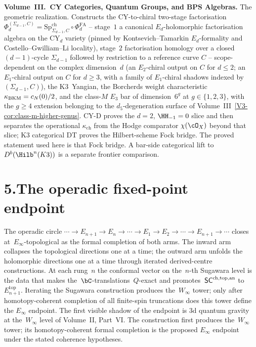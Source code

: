 \noindent\textbf{Volume~III.\ CY Categories, Quantum Groups, and BPS
Algebras.}\enspace
The geometric realization. Constructs the CY-to-chiral two-stage
factorisation
$\Phi_d^{(\Sigma_{d-1},C)} = \mathrm{Sp}^{\mathrm{ch}}_{\Sigma_{d-1}, C} \circ
\Phi^{\mathrm{FA}}_d$ -- stage~$1$ a canonical $E_d$-holomorphic
factorisation algebra on the CY$_d$ variety (pinned by
Kontsevich--Tamarkin $E_d$-formality and Costello--Gwilliam--Li
locality), stage~$2$ factorisation homology over a closed
$(d-1)$-cycle $\Sigma_{d-1}$ followed by restriction to a reference
curve $C$ -- scope-dependent on the complex dimension~$d$ (an
$E_2$-chiral output on $C$ for $d\le 2$; an $E_1$-chiral output on
$C$ for $d\ge 3$, with a family of $E_1$-chiral shadows indexed by
$(\Sigma_{d-1}, C)$), the K3~Yangian,
the Borcherds weight characteristic~$\kappa_{\mathrm{BKM}} = c_N(0)/2$, and the
class-$M$ $E_3$ bar of
dimension~$6^g$ at $g\in\{1,2,3\}$, with the $g\ge 4$ extension
belonging to the $d_5$-degeneration surface of
Volume~III~\ref{V3-cor:class-m-higher-genus}.
CY-D proves the $d=2$,
$\HH_{-1}=0$ slice and then separates the operational
$\kappa_{\mathrm{ch}}$ from the Hodge comparator
$\chi(\cO_X)$ beyond that slice; K3 categorical DT proves the
Hilbert-scheme Fock bridge. The proved statement used here is that
Fock bridge.  A bar-side categorical lift to
$D^b(\Hilb^n(K3))$ is a separate frontier comparison.

\section*{5.\quad The operadic fixed-point endpoint}

\noindent
The operadic circle
$\cdots\to E_{n+1}\to E_n\to\cdots\to E_1\to E_2\to\cdots\to E_{n+1}\to\cdots$
closes at~$E_\infty$-topological as the formal completion of both
arms. The inward arm collapses the topological directions one at a
time; the outward arm unfolds the holomorphic directions one at a
time through iterated derived-centre constructions. At each rung~$n$
the conformal vector on the~$n$-th Sugawara level is the data that
makes the~$\bC$-translations~$Q$-exact and promotes~$\mathsf{SC}^{\mathrm{ch,top,an}}$
to~$E_{n+1}^{\mathrm{top}}$. Iterating the Sugawara construction
produces the~$W_\infty$ tower; only after homotopy-coherent
completion of all finite-spin truncations does this tower define the
$E_\infty$ endpoint.
The first visible shadow of the endpoint is 3d quantum gravity at
the~$W_\infty$ level of Volume~II, Part~VI\@. The construction first
produces the~$W_\infty$ tower; its homotopy-coherent formal completion
is the proposed $E_\infty$ endpoint under the stated coherence
hypotheses.

